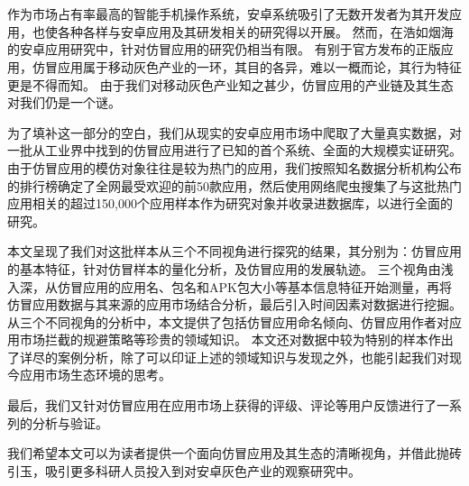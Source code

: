 
\chapter*{}
\vspace{-5mm}

\setlength{\baselineskip}{25pt} %

作为市场占有率最高的智能手机操作系统，安卓系统吸引了无数开发者为其开发应用，也使各种各样与安卓应用及其研发相关的研究得以开展。
然而，在浩如烟海的安卓应用研究中，针对仿冒应用的研究仍相当有限。
有别于官方发布的正版应用，仿冒应用属于移动灰色产业的一环，其目的各异，难以一概而论，其行为特征更是不得而知。
由于我们对移动灰色产业知之甚少，仿冒应用的产业链及其生态对我们仍是一个谜。

为了填补这一部分的空白，我们从现实的安卓应用市场中爬取了大量真实数据，对一批从工业界中找到的仿冒应用进行了已知的首个系统、全面的大规模实证研究。
由于仿冒应用的模仿对象往往是较为热门的应用，我们按照知名数据分析机构公布的排行榜确定了全网最受欢迎的前50款应用，然后使用网络爬虫搜集了与这批热门应用相关的超过150,000个应用样本作为研究对象并收录进数据库，以进行全面的研究。

本文呈现了我们对这批样本从三个不同视角进行探究的结果，其分别为：仿冒应用的基本特征，针对仿冒样本的量化分析，及仿冒应用的发展轨迹。
三个视角由浅入深，从仿冒应用的应用名、包名和APK包大小等基本信息特征开始测量，再将仿冒应用数据与其来源的应用市场结合分析，最后引入时间因素对数据进行挖掘。
从三个不同视角的分析中，本文提供了包括仿冒应用命名倾向、仿冒应用作者对应用市场拦截的规避策略等珍贵的领域知识。
本文还对数据中较为特别的样本作出了详尽的案例分析，除了可以印证上述的领域知识与发现之外，也能引起我们对现今应用市场生态环境的思考。

最后，我们又针对仿冒应用在应用市场上获得的评级、评论等用户反馈进行了一系列的分析与验证。

我们希望本文可以为读者提供一个面向仿冒应用及其生态的清晰视角，并借此抛砖引玉，吸引更多科研人员投入到对安卓灰色产业的观察研究中。

 

